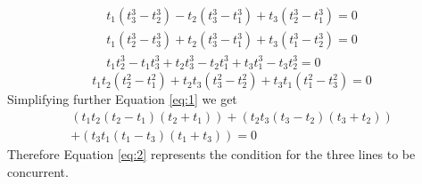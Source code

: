 \documentclass[journal,12pt,twocolumn]{IEEEtran}
\begin{document}
\begin{align}
t_1(t_3^3-t_2^3)-t_2(t_3^3-t_1^3)+t_3(t_2^3-t_1^3)=0\\
t_1(t_2^3-t_3^3)+t_2(t_3^3-t_1^3)+t_3(t_1^3-t_2^3)=0\\
t_1t_2^3-t_1t_3^3+t_2t_3^3-t_2t_1^3+t_3t_1^3-t_3t_2^3=0
\end{align}
\begin{equation}
t_1t_2(t_2^2-t_1^2)+t_2t_3(t_3^2-t_2^2)+t_3t_1(t_1^2-t_3^2)=0
\label{eq:1}
\end{equation}
Simplifying further Equation \eqref{eq:1} we get 
\begin{equation}
\begin{split}
(t_1t_2(t_2-t_1)(t_2+t_1))+(t_2t_3(t_3-t_2)(t_3+t_2))\\
+(t_3t_1(t_1-t_3)(t_1+t_3))=0
\end{split}
\label{eq:2}
\end{equation}
Therefore Equation \eqref{eq:2} represents the condition for the three lines to be concurrent.
\end{document}

